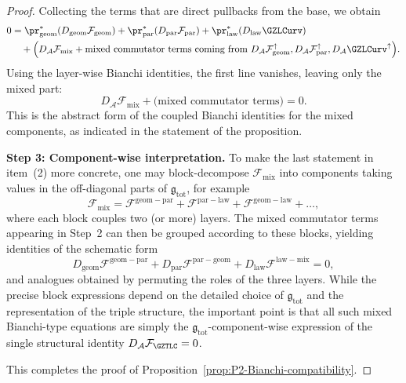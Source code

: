 \documentclass[11pt]{book}
\theoremstyle{plain}
\theoremstyle{definition}
\begin{document}
\begin{proof}
Collecting the terms that are direct pullbacks from the base, we
obtain
\begin{align*}
  0
  &= \pr_{\mathrm{geom}}^*(D_{\mathrm{geom}}\mathcal{F}_{\mathrm{geom}})
     +
     \pr_{\mathrm{par}}^*(D_{\mathrm{par}}\mathcal{F}_{\mathrm{par}})
     +
     \pr_{\mathrm{law}}^*(D_{\mathrm{law}}\GZLCurv) \\
  &\quad
     +
     \Bigl(
       D_{\mathcal{A}}\mathcal{F}_{\mathrm{mix}}
       +
       \text{mixed commutator terms coming from }
       D_{\mathcal{A}}\mathcal{F}_{\mathrm{geom}}^{\uparrow},
       D_{\mathcal{A}}\mathcal{F}_{\mathrm{par}}^{\uparrow},
       D_{\mathcal{A}}\GZLCurv^{\uparrow}
     \Bigr).
\end{align*}
Using the layer-wise Bianchi identities, the first line vanishes,
leaving only the mixed part:
\[
  D_{\mathcal{A}}\mathcal{F}_{\mathrm{mix}}
  +
  \text{(mixed commutator terms)}
  = 0.
\]
This is the abstract form of the coupled Bianchi identities for the
mixed components, as indicated in the statement of the proposition.



\medskip\noindent
\textbf{Step 3: Component-wise interpretation.}
To make the last statement in item~\textnormal{(2)} more concrete,
one may block-decompose \(\mathcal{F}_{\mathrm{mix}}\) into components
taking values in the off-diagonal parts of \(\mathfrak{g}_{\mathrm{tot}}\),
for example
\[
  \mathcal{F}_{\mathrm{mix}}
  =
  \mathcal{F}^{\mathrm{geom-par}}
  +
  \mathcal{F}^{\mathrm{par-law}}
  +
  \mathcal{F}^{\mathrm{geom-law}}
  + \dots,
\]
where each block couples two (or more) layers.  The mixed commutator
terms appearing in Step~2 can then be grouped according to these
blocks, yielding identities of the schematic form
\[
  D_{\mathrm{geom}}\mathcal{F}^{\mathrm{geom-par}}
  +
  D_{\mathrm{par}}\mathcal{F}^{\mathrm{par-geom}}
  +
  D_{\mathrm{law}}\mathcal{F}^{\mathrm{law-mix}}
  = 0,
\]
and analogues obtained by permuting the roles of the three layers.
While the precise block expressions depend on the detailed choice of
\(\mathfrak{g}_{\mathrm{tot}}\) and the representation of the triple
structure, the important point is that all such mixed Bianchi-type
equations are simply the \(\mathfrak{g}_{\mathrm{tot}}\)-component-wise
expression of the single structural identity
\(D_{\mathcal{A}}\mathcal{F}_{\GZTLC}=0\).

This completes the proof of
Proposition~\ref{prop:P2-Bianchi-compatibility}.



\end{proof}
\end{document}
